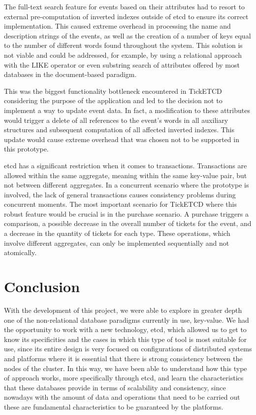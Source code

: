 \documentclass[screen,review]{acmart}
\begin{document}
The full-text search feature for events based on their attributes had to resort to external pre-computation of inverted indexes outside of etcd to ensure its correct implementation. This caused extreme overhead in processing the name and description strings of the events, as well as the creation of a number of keys equal to the number of different words found throughout the system. This solution is not viable and could be addressed, for example, by using a relational approach with the LIKE operator or even substring search of attributes offered by most databases in the document-based paradigm.

This was the biggest functionality bottleneck encountered in TickETCD considering the purpose of the application and led to the decision not to implement a way to update event data. In fact, a modification to these attributes would trigger a delete of all references to the event's words in all auxiliary structures and subsequent computation of all affected inverted indexes. This update would cause extreme overhead that was chosen not to be supported in this prototype.

etcd has a significant restriction when it comes to transactions. Transactions are allowed within the same aggregate, meaning within the same key-value pair, but not between different aggregates. In a concurrent scenario where the prototype is involved, the lack of general transactions causes consistency problems during concurrent moments. The most important scenario for TickETCD where this robust feature would be crucial is in the purchase scenario. A purchase triggers a comparison, a possible decrease in the overall number of tickets for the event, and a decrease in the quantity of tickets for each type. These operations, which involve different aggregates, can only be implemented sequentially and not atomically.

\section{Conclusion}
With the development of this project, we were able to explore in greater depth one of the non-relational database paradigms currently in use, key-value. We had the opportunity to work with a new technology, etcd, which allowed us to get to know its specificities and the cases in which this type of tool is most suitable for use, since its entire design is very focused on configurations of distributed systems and platforms where it is essential that there is strong consistency between the nodes of the cluster.
In this way, we have been able to understand how this type of approach works, more specifically through etcd, and learn the characteristics that these databases provide in terms of scalability and consistency, since nowadays with the amount of data and operations that need to be carried out these are fundamental characteristics to be guaranteed by the platforms.
\end{document}
